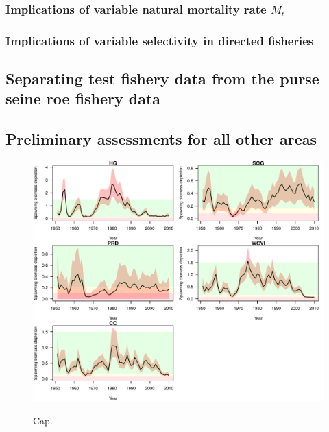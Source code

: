 		\subsubsection{Implications of variable natural mortality rate $M_t$}
		\subsubsection{Implications of variable selectivity in directed fisheries}
	\subsection{Separating test fishery data from the purse seine roe fishery data}
	\subsection{Preliminary assessments for all other areas}
	
\begin{figure}[!tbp]
	\includegraphics[width=\textwidth]{../Figs/figSBmcmc.pdf}\\
	\caption{Cap.}\label{label}
\end{figure}
